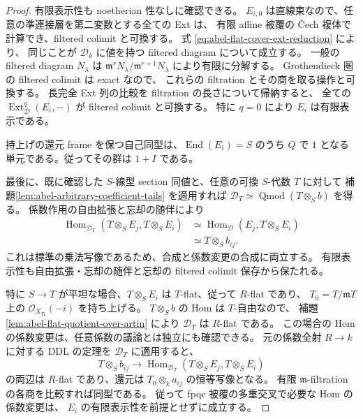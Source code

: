 \begin{proof}
有限表示性も noetherian 性なしに確認できる。
$E_{i,0}$ は直線束なので、任意の準連接層を第二変数とする全ての Ext は、
有限 affine 被覆の \v Cech 複体で計算でき、filtered colimit と可換する。
式 \eqref{eq:abel-flat-cover-ext-reduction} により、
同じことが $\mathcal D_k$ に値を持つ filtered diagram について成立する。
一般の filtered diagram $N_\lambda$ は
$\mathfrak m^rN_\lambda/\mathfrak m^{r+1}N_\lambda$ により有限に分解する。
Grothendieck 圏の filtered colimit は exact なので、
これらの filtration とその商を取る操作と可換する。
長完全 Ext 列の比較を filtration の長さについて帰納すると、
全ての $\operatorname{Ext}^q_{\mathcal D}(E_i,-)$ が filtered colimit と可換する。
特に $q=0$ により $E_i$ は有限表示である。

持上げの還元 frame を保つ自己同型は、$\operatorname{End}(E_i)=S$ のうち
$Q$ で $1$ となる単元である。従ってその群は $1+I$ である。

最後に、既に確認した $S$-線型 section 同値と、任意の可換 $S$-代数 $T$ に対して
補題\ref{lem:abel-arbitrary-coefficient-tails} を適用すれば
$\mathcal D_T\simeq\operatorname{Qmod}(T\otimes_Sb)$ を得る。
係数作用の自由拡張と忘却の随伴により
\begin{align*}
 \operatorname{Hom}_{\mathcal D_T}(T\otimes_SE_j,T\otimes_SE_i)
 &\simeq\operatorname{Hom}_{\mathcal D}(E_j,T\otimes_SE_i)\\
 &\simeq T\otimes_Sb_{ij}.
\end{align*}
これは標準の乗法写像であるため、合成と係数変更の合成に両立する。
有限表示性も自由拡張・忘却の随伴と忘却の filtered colimit 保存から保たれる。

特に $S\to T$ が平坦な場合、$T\otimes_SE_i$ は $T$-flat、従って $R$-flat であり、
$T_0=T/\mathfrak mT$ 上の $\mathcal O_{X_{T_0}}(-i)$ を持ち上げる。
$T\otimes_Sb$ の Hom は $T$-自由なので、
補題\ref{lem:abel-flat-quotient-over-artin} により $\mathcal D_T$ は $R$-flat である。
この場合の Hom の係数変更は、任意係数の議論とは独立にも確認できる。
元の係数全射 $R\to k$ に対する DDL の定理を $\mathcal D_T$ に適用すると、
\[
 T\otimes_S b_{ij}\longrightarrow
 \operatorname{Hom}_{\mathcal D_T}(T\otimes_SE_j,T\otimes_SE_i)
\]
の両辺は $R$-flat であり、還元は
$T_0\otimes_k a_{ij}$ の恒等写像となる。
有限 $\mathfrak m$-filtration の各商を比較すれば同型である。
従って fpqc 被覆の多重交叉で必要な Hom の係数変更は、
$E_i$ の有限表示性を前提とせずに成立する。
\end{proof}

